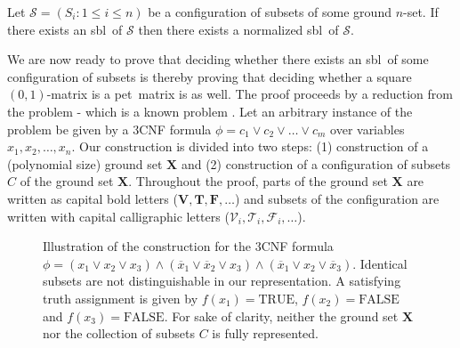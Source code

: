\documentclass[a4paper,10pt]{llncs}
\newcommand{\PET}{pet}
\newcommand{\SBL}{sbl}
\begin{document}
\begin{lemma}
  \label{lemma:normalized stepwise bounded}
  Let $\mathcal{S} = (S_i : 1 \leq i \leq n)$ be a configuration of subsets of
    some ground $n$-set.
    If there exists an \SBL\ of $\mathcal{S}$
    then there exists a normalized \SBL\ of $\mathcal{S}$.
\end{lemma}

We are now ready to prove that
deciding whether there exists an \SBL\ of some
configuration of subsets is \NPC thereby proving that 
deciding whether a square $(0,1)$-matrix is a \PET\ matrix is \NPcomplete as well.
The proof proceeds by a reduction from the  problem - which is a known
\NPcomplete problem \cite{Cook:1971}.
Let an arbitrary
instance of the  problem be given by a $3$CNF formula 
$\phi = c_1 \vee c_2 \vee \ldots \vee c_m$ over variables 
$x_1, x_2, \ldots, x_n$. 
Our construction is divided into two steps: 
(1) construction of a (polynomial size) ground set $\mathbf{X}$ and 
(2) construction of a configuration of subsets $C$ of the ground set
$\mathbf{X}$. 
Throughout the proof, parts of the ground set
$\mathbf{X}$ are written as capital bold letters 
($\mathbf{V}, \mathbf{T}, \mathbf{F}, \ldots$)
and subsets of the configuration are written with capital calligraphic
letters ($\mathcal{V}_i, \mathcal{T}_i, \mathcal{F}_i, \ldots$). 

  \begin{figure}[H]
    \centering
    \begin{minipage}[c]{\textwidth}
      \centering
      
      \caption{\label{fig:stepwise bounded labeling construction}
          Illustration of the construction 
          for the $3$CNF formula 
          $\phi = (x_1 \vee x_2 \vee x_3) \wedge 
          (\overline{x}_1 \vee \overline{x}_2 \vee x_3) \wedge 
          (\overline{x}_1 \vee x_2 \vee \overline{x}_3)$. 
          Identical subsets are not distinguishable
          in our representation. A satisfying truth assignment is
          given by $f(x_1) = \mbox{TRUE}$, $f(x_2) = \mbox{FALSE}$ and
          $f(x_3) = \mbox{FALSE}$. For sake of clarity, neither
          the ground set $\mathbf{X}$ nor the collection of subsets
          $C$ is fully represented. 
          } 
    \end{minipage}%
  \end{figure}
\end{document}
